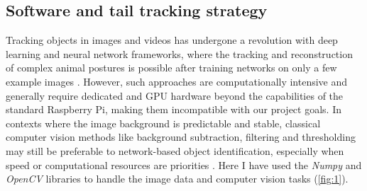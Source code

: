 \documentclass[9pt,lineno]{RandlettLab_elife}
\begin{document}
\subsection{Software and tail tracking strategy}

Tracking objects in images and videos has undergone a revolution with deep learning and neural network frameworks, where the tracking and reconstruction of complex animal postures is possible after training networks on only a few example images \citep{Mathis2018-rw, Pereira2022-rd}. However, such approaches are computationally intensive and generally require dedicated and GPU hardware beyond the capabilities of the standard Raspberry Pi, making them incompatible with our project goals. In contexts where the image background is predictable and stable, classical computer vision methods like background subtraction, filtering and thresholding may still be preferable to network-based object identification, especially when speed or computational resources are priorities \citep{Mirat2013, Stih2019-gx, Zhu2023}. Here I have used the \emph{Numpy} \citep{harris2020array} and \emph{OpenCV} \citep{opencv_library} libraries to handle the image data and computer vision tasks (\autoref{fig:1}). 
\end{document}
